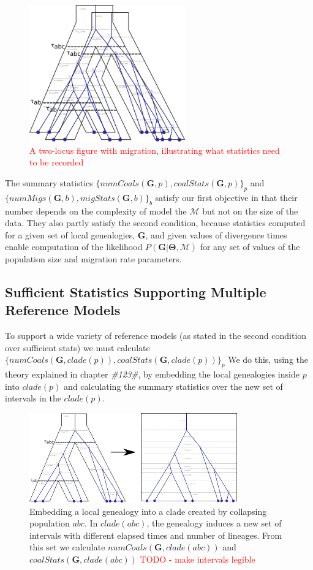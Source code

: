 \documentclass[11pt]{article}
\newcommand{\vect}[1]{\boldsymbol{\mathbf{#1}}}
\newcommand{\M}{\mathcal{M}}
\newcommand{\G}{\vect{G}}
\newcommand{\T}{\vect{\Theta}}
\newcommand{\1}{\mathbbm{1}}
\begin{document}
\begin{figure}[h]
\centering
\includegraphics[width=0.6\textwidth]
{two_locus}
\caption{\textcolor{red}{A two-locus figure with migration, illustrating what statistics need to be recorded}}
\end{figure}


The summary statistics $\{numCoals(\G,p), coalStats(\G,p)\}_p$ and $\{numMigs(\G,b), migStats(\G,b)\}_b$ satisfy our first objective in that their number depends on the complexity of model the $\M$ but not on the size of the data.
%
They also partly satisfy the second condition, because statistics computed for a given set of local genealogies, $\G$, and given values of divergence times enable computation of the likelihood $P(\G|\T,\M)$ for any set of values of the population size and migration rate parameters.
%

\subsection{Sufficient Statistics Supporting Multiple Reference Models}
To support a wide variety of reference models (as stated in the second condition over sufficient stats) we must calculate $\{numCoals(\G,clade(p)), coalStats(\G,clade(p))\}_p$%
We do this, using the theory explained in chapter \textit{\#123\#}, by embedding the local genealogies inside $p$ into $clade(p)$ and calculating the summary statistics over the new set of intervals in the $clade(p)$. 
\begin{figure}[h]
\centering
\includegraphics[width=0.8\textwidth]
{embed_in_null_model}
\caption{Embedding a local genealogy into a clade created by collapsing population $abc$. In $clade(abc)$, the genealogy induces a new set of intervals with different elapsed times and number of lineages. From this set we calculate $numCoals(\G,clade(abc))$ and $coalStats(\G,clade(abc))$ \textcolor{red}{TODO - make intervals legible}}
\end{figure}
\end{document}
